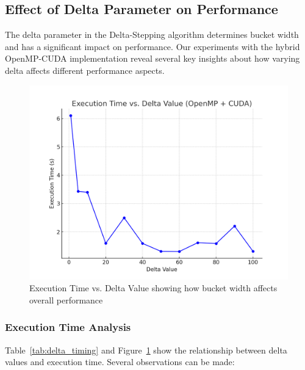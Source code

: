 \documentclass{article}
\begin{document}
\subsection*{Effect of Delta Parameter on Performance}

The delta parameter in the Delta-Stepping algorithm determines bucket width and has a significant impact on performance. Our experiments with the hybrid OpenMP-CUDA implementation reveal several key insights about how varying delta affects different performance aspects.

\begin{figure}[ht]
    \centering
    \includegraphics[width=\linewidth]{execution_time_vs_delta.png}
    \caption{Execution Time vs. Delta Value showing how bucket width affects overall performance}
    \label{fig:exec_time_delta}
\end{figure}

\subsubsection*{Execution Time Analysis}

Table~\ref{tab:delta_timing} and Figure~\ref{fig:exec_time_delta} show the relationship between delta values and execution time. Several observations can be made:
\end{document}
